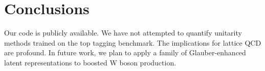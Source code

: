 \section{Conclusions}\label{sec:conclusions}

Our code is publicly available. We have not attempted to quantify
unitarity methods trained on the top tagging benchmark. The implications
for lattice QCD are profound. In future work, we plan to apply a family
of Glauber-enhanced latent representations to boosted W boson
production.

